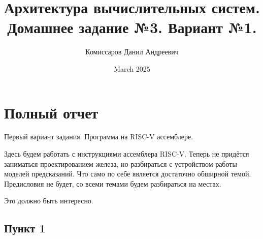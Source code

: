 

\title{Архитектура вычислительных систем. Домашнее задание №3. Вариант №1.}
\author{Комиссаров Данил Андреевич}
\date{March 2025}



\maketitle

\section{Полный отчет}
Первый вариант задания. Программа на RISC-V ассемблере.

Здесь будем работать с инструкциями ассемблера RISC-V. Теперь не придётся заниматься проектированием железа, но разбираться с устройством работы моделей предсказаний. Что само по себе является достаточно обширной темой. Предисловия не будет, со всеми темами будем разбираться на местах. 

Это должно быть интересно.

\subsection*{Пункт 1}

